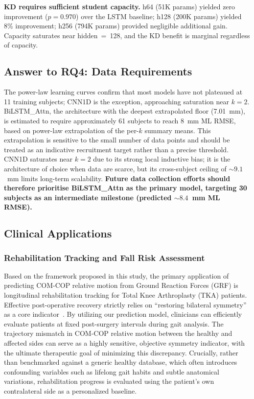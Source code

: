 \documentclass[preprint,12pt]{elsarticle}
\begin{document}
\textbf{KD requires sufficient student capacity.}
h64 (51K params) yielded zero improvement ($p = 0.970$) over the LSTM baseline;
h128 (200K params) yielded 8\% improvement; h256 (794K params) provided
negligible additional gain.
Capacity saturates near hidden~=~128, and the KD benefit is marginal regardless
of capacity.

\subsection{Answer to RQ4: Data Requirements}

The power-law learning curves confirm that most models have not plateaued at
11 training subjects; CNN1D is the exception, approaching saturation near $k=2$.
BiLSTM\_Attn, the architecture with the deepest extrapolated floor (7.01~mm),
is estimated to require approximately 61 subjects to reach 8~mm ML RMSE,
based on power-law extrapolation of the per-$k$ summary means.
This extrapolation is sensitive to the small number of data points and should be
treated as an indicative recruitment target rather than a precise threshold.
CNN1D saturates near $k = 2$ due to its strong local inductive bias; it is the
architecture of choice when data are scarce, but its cross-subject ceiling of
${\sim}9.1$~mm limits long-term scalability.
\textbf{Future data collection efforts should therefore prioritise BiLSTM\_Attn
as the primary model, targeting 30 subjects as an intermediate milestone
(predicted ${\sim}8.4$~mm ML RMSE).}

\subsection{Clinical Applications}
\label{subsec:applications}

\subsubsection{Rehabilitation Tracking and Fall Risk Assessment}
\label{subsubsec:rehab}

Based on the framework proposed in this study, the primary application of
predicting COM-COP relative motion from Ground Reaction Forces (GRF) is
longitudinal rehabilitation tracking for Total Knee Arthroplasty (TKA) patients.
Effective post-operative recovery strictly relies on ``restoring bilateral
symmetry'' as a core indicator~\cite{tka2025}.
By utilizing our prediction model, clinicians can efficiently evaluate patients at
fixed post-surgery intervals during gait analysis.
The trajectory mismatch in COM-COP relative motion between the healthy and
affected sides can serve as a highly sensitive, objective symmetry indicator, with
the ultimate therapeutic goal of minimizing this discrepancy.
Crucially, rather than benchmarked against a generic healthy database, which often
introduces confounding variables such as lifelong gait habits and subtle anatomical
variations, rehabilitation progress is evaluated using the patient's own
contralateral side as a personalized baseline.
\end{document}
